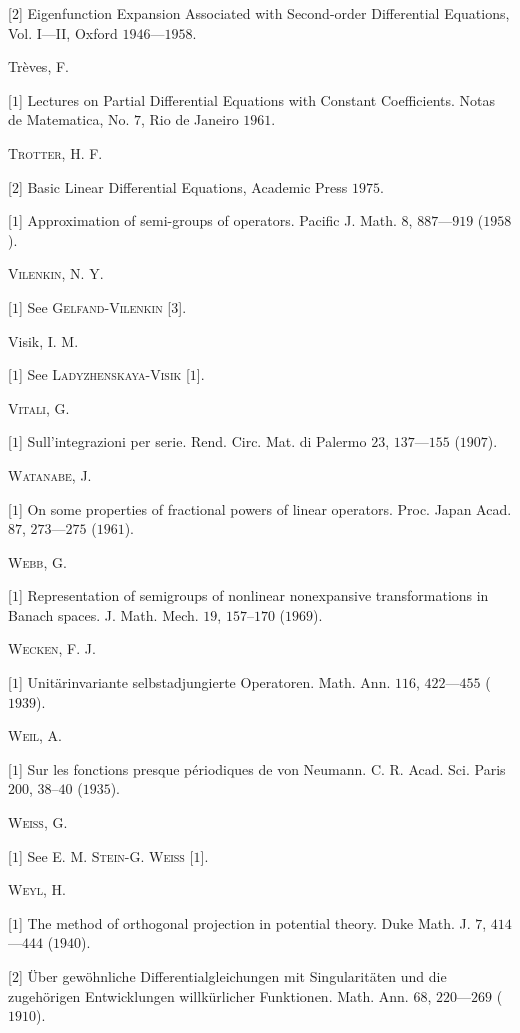 [$2$] Eigenfunction Expansion Associated with Second-order Differential Equations, Vol. I---II, Oxford $1946$---$1958$. 

Trèves, F. 

[$1$] Lectures on Partial Differential Equations with Constant Coefficients. Notas de Matematica, No. $7$, Rio de Janeiro $1961$. 

\textsc{Trotter}, H. F. 

[$2$] Basic Linear Differential Equations, Academic Press $1975$. 

[$1$] Approximation of semi-groups of operators. Pacific J. Math. $8$, $887$---$919$ ($1958$). 

\textsc{Vilenkin}, N. Y. 

[$1$] See \textsc{Gelfand}-\textsc{Vilenkin} [$3$]. 

Visik, I. M. 

[$1$] See \textsc{Ladyzhenskaya}-\textsc{Visik} [$1$]. 

\textsc{Vitali}, G. 

[$1$] Sull'integrazioni per serie. Rend. Circ. Mat. di Palermo $23$, $137$---$155$ ($1907$). 

\textsc{Watanabe}, J. 

[$1$] On some properties of fractional powers of linear operators. Proc. Japan Acad. $87$, $273$---$275$ ($1961$). 

\textsc{Webb}, G. 

[$1$] Representation of semigroups of nonlinear nonexpansive transformations in Banach spaces. J. Math. Mech. $19$, $157$--$170$ ($1969$). 

\textsc{Wecken}, F. J. 

[$1$] Unitärinvariante selbstadjungierte Operatoren. Math. Ann. $116$, $422$---$455$ ($1939$). 

\textsc{Weil}, A. 

[$1$] Sur les fonctions presque périodiques de von Neumann. C. R. Acad. Sci. Paris $200$, $38$--$40$ ($1935$). 

\textsc{Weiss}, G. 

[$1$] See E. M. \textsc{Stein}-G. \textsc{Weiss} [$1$]. 

\textsc{Weyl}, H. 

[$1$] The method of orthogonal projection in potential theory. Duke Math. J. $7$, $414$---$444$ ($1940$). 

[$2$] Über gewöhnliche Differentialgleichungen mit Singularitäten und die zugehörigen Entwicklungen willkürlicher Funktionen. Math. Ann. $68$, $220$---$269$ ($1910$). 

